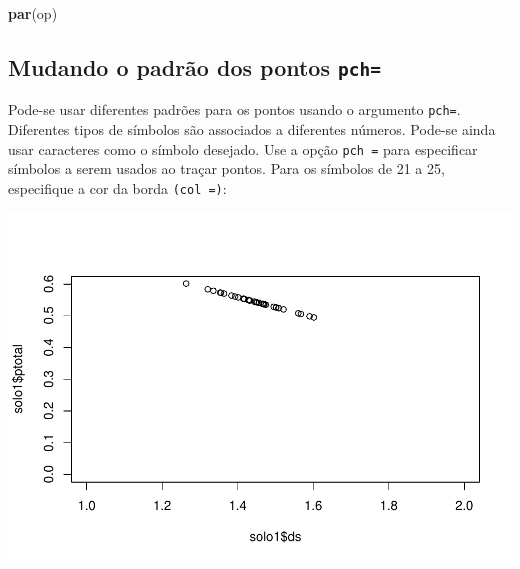\documentclass[
]{book}
\newenvironment{Shaded}{\begin{snugshade}}{\end{snugshade}}
\newcommand{\DataTypeTok}[1]{\textcolor[rgb]{0.13,0.29,0.53}{#1}}
\newcommand{\DecValTok}[1]{\textcolor[rgb]{0.00,0.00,0.81}{#1}}
\newcommand{\FloatTok}[1]{\textcolor[rgb]{0.00,0.00,0.81}{#1}}
\newcommand{\KeywordTok}[1]{\textcolor[rgb]{0.13,0.29,0.53}{\textbf{#1}}}
\newcommand{\NormalTok}[1]{#1}
\newcommand{\OperatorTok}[1]{\textcolor[rgb]{0.81,0.36,0.00}{\textbf{#1}}}
\begin{document}
\begin{Shaded}
\begin{Highlighting}[]
\KeywordTok{par}\NormalTok{(op)}
\end{Highlighting}
\end{Shaded}

\hypertarget{mudando-o-padruxe3o-dos-pontos-pch}{%
\subsection{\texorpdfstring{Mudando o padrão dos pontos \texttt{pch=}}{Mudando o padrão dos pontos pch=}}\label{mudando-o-padruxe3o-dos-pontos-pch}}

Pode-se usar diferentes padrões para os pontos usando o argumento \texttt{pch=}. Diferentes tipos de símbolos são associados a diferentes números. Pode-se ainda usar caracteres como o símbolo desejado.
Use a opção \texttt{pch\ =} para especificar símbolos a serem usados ao traçar pontos. Para os símbolos de 21 a 25, especifique a cor da borda \texttt{(col\ =)}:

\begin{Shaded}
\end{Shaded}

\includegraphics{TudodoR_files/figure-latex/unnamed-chunk-155-1.pdf}
\end{document}
